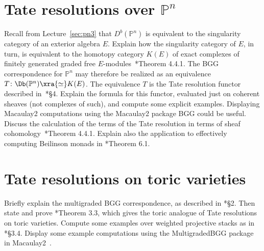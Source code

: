 \documentclass[11pt]{amsart}
\numberwithin{equation}{section}
\theoremstyle{definition}
\theoremstyle{remark}
\newcommand{\PP}{\mathbb P}
\def\co{\colon}
\begin{document}
\section{Tate resolutions over $\PP^n$}
 Recall from Lecture~\ref{sec:pn3} that $D^b(\PP^n)$ is equivalent to the singularity category of an exterior algebra $E$. Explain how the singularity category of $E$, in turn, is equivalent to the homotopy category $K(E)$ of exact complexes of finitely generated graded free $E$-modules~\cite{buchweitz}*{Theorem 4.4.1}. The BGG correspondence for $\PP^n$ may therefore be realized as an equivalence $T \co \Db(\PP^n) \xra{\simeq} K(E)$. The equivalence $T$ is the Tate resolution functor described in~\cite{EFS}*{\S 4}. Explain the formula for this functor, evaluated just on coherent sheaves (not complexes of such), and compute some explicit examples. Displaying Macaulay2 computations using the Macaulay2 package BGG could be useful. Discuss the calculation of the terms of the Tate resolution in terms of sheaf cohomology~\cite{EFS}*{Theorem 4.4.1}. Explain also the application to effectively computing Beilinson monads in \cite{EFS}*{Theorem 6.1}. 

 \section{Tate resolutions on toric varieties}
 Briefly explain the multigraded BGG correspondence, as described in \cite{BETate}*{\S 2}. Then state and prove \cite{BETate}*{Theorem 3.3}, which gives the toric analogue of Tate resolutions on toric varieties. Compute some examples over weighted projective stacks as in \cite{BETate}*{\S 3.4}. Display some example computations using the MultigradedBGG package in Macaulay2~\cite{BBGSTZ}. 

\medskip





\end{document}
